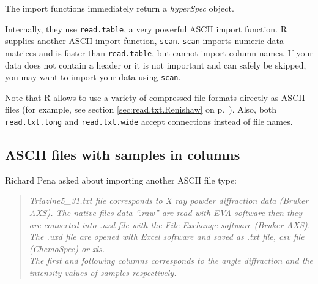 \documentclass[english, a4paper, 10pt, headings=small, DIV11]{scrartcl}
\newcommand{\Rfunction}[2][]{\texorpdfstring{\nohyphens{#1\texttt{#2}}}{#2}}
\newcommand{\Rclass}[1]{\texorpdfstring{\nohyphens{\textit{#1}}}{#1}}
\begin{document}
The import functions immediately return a \Rclass{hyperSpec} object.

Internally, they use \Rfunction{read.table}, a very powerful ASCII import function.  R supplies
another ASCII import function, \Rfunction{scan}.  \Rfunction{scan} imports numeric data matrices and
is faster than \Rfunction{read.table}, but cannot import column names.  If your data does not contain
a header or it is not important and can safely be skipped, you may want to import your data using
\Rfunction{scan}.

Note that R allows to use a variety of compressed file formats directly as ASCII files (for example,
see section \ref{sec:read.txt.Renishaw} on p.~\pageref{sec:read.txt.Renishaw}). Also, both
\Rfunction{read.txt.long} and \Rfunction{read.txt.wide} accept connections instead of file names.

\subsection{ASCII files with samples in columns}
\label{sec:ascii-files-cols}
Richard Pena asked about importing another ASCII file type:
\begin{quote}
\emph{\noindent Triazine5\_31.txt file corresponds to X ray powder diffraction data (Bruker AXS). The
native files data ``.raw'' are read with EVA software then they are converted into .uxd file with the
File Exchange software (Bruker AXS). The  .uxd file are opened with Excel software and saved as .txt
file, csv file (ChemoSpec) or xls.\\
The first and following columns corresponds to the angle diffraction and the intensity values of
samples respectively.}
\end{quote}
\end{document}
